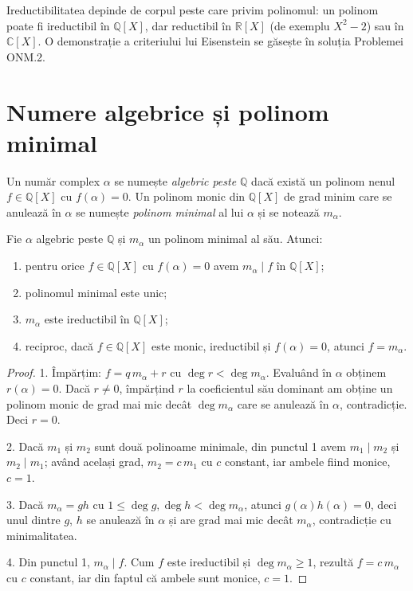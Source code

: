 \begin{observatie}
Ireductibilitatea depinde de corpul peste care privim polinomul: un polinom poate fi ireductibil în $\mathbb{Q}[X]$, dar reductibil în $\mathbb{R}[X]$ (de exemplu $X^2-2$) sau în $\mathbb{C}[X]$. O demonstrație a criteriului lui Eisenstein se găsește în soluția Problemei ONM.2.
\end{observatie}

\section{Numere algebrice și polinom minimal}

\begin{definitie}
Un număr complex $\alpha$ se numește \emph{algebric peste $\mathbb{Q}$} dacă există un polinom nenul $f\in\mathbb{Q}[X]$ cu $f(\alpha)=0$. Un polinom monic din $\mathbb{Q}[X]$ de grad minim care se anulează în $\alpha$ se numește \emph{polinom minimal} al lui $\alpha$ și se notează $m_\alpha$.
\end{definitie}

\begin{teorema}\label{teo:minimalalg}
Fie $\alpha$ algebric peste $\mathbb{Q}$ și $m_\alpha$ un polinom minimal al său. Atunci:
\begin{enumerate}
\item pentru orice $f \in \mathbb{Q}[X]$ cu $f(\alpha) = 0$ avem $m_\alpha \mid f$ în $\mathbb{Q}[X]$;
\item polinomul minimal este unic;
\item $m_\alpha$ este ireductibil în $\mathbb{Q}[X]$;
\item reciproc, dacă $f \in \mathbb{Q}[X]$ este monic, ireductibil și $f(\alpha) = 0$, atunci $f = m_\alpha$.
\end{enumerate}
\end{teorema}

\begin{proof}
1. Împărțim: $f = q\,m_\alpha + r$ cu $\deg r < \deg m_\alpha$. Evaluând în $\alpha$ obținem $r(\alpha) = 0$. Dacă $r \neq 0$, împărțind $r$ la coeficientul său dominant am obține un polinom monic de grad mai mic decât $\deg m_\alpha$ care se anulează în $\alpha$, contradicție. Deci $r = 0$.

2. Dacă $m_1$ și $m_2$ sunt două polinoame minimale, din punctul 1 avem $m_1 \mid m_2$ și $m_2 \mid m_1$; având același grad, $m_2 = c\,m_1$ cu $c$ constant, iar ambele fiind monice, $c = 1$.

3. Dacă $m_\alpha = gh$ cu $1 \le \deg g, \deg h < \deg m_\alpha$, atunci $g(\alpha)h(\alpha) = 0$, deci unul dintre $g$, $h$ se anulează în $\alpha$ și are grad mai mic decât $m_\alpha$, contradicție cu minimalitatea.

4. Din punctul 1, $m_\alpha \mid f$. Cum $f$ este ireductibil și $\deg m_\alpha \ge 1$, rezultă $f = c\,m_\alpha$ cu $c$ constant, iar din faptul că ambele sunt monice, $c = 1$.
\end{proof}


